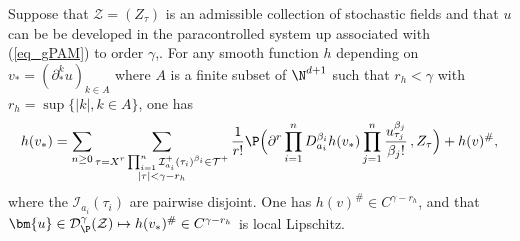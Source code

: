 \documentclass[11pt]{preprint}
\newcommand{\mcI}{\mathcal{I}}
\newcommand{\mcD}{\mathcal{D}}
\newcommand{\mcZ}{\mathcal{Z}}
\newcommand{\mcT}{\mathcal{T}}
\newcounter{theorem}
\def\eqref#1{(\ref{#1})}
\begin{document}
	
 	\begin{theorem}\label{prop_paralinearization}
		Suppose that $\mcZ=(Z_\tau)$ is an admissible collection of stochastic fields and that $u$ can be be developed in the paracontrolled system up associated with \eqref{eq_gPAM} to order $\gamma$,.
For any smooth function $h$ depending on $v_* = (\partial^k_{*} u)_{k \in A}$ where $A$ is a finite subset of $\N^{d+1}$ such that $r_h<\gamma$ with $r_h =\sup \{ |k|,k\in A\} $, one has 
			$$
			h(v_*) = \sum_{n\geq 0}\sum_{\substack{\tau=  X^r \prod_{i=1}^{n}\mcI^+_{a_i}(\tau_i)^{\beta_i}\in\mcT^+ \\ |\tau|<\gamma-r_h}} \frac{1}{ r!}\P\Big( \partial^r \prod_{i=1}^n D_{a_i}^{\beta_i} h(v_*) \prod_{j=1}^{n} \frac{u_{\tau_j}^{\beta_j}}{\beta_j!} \, ,Z_\tau\Big)  + h(v)^\#,
			$$
			where the $ \mathcal{I}_{a_i}(\tau_i) $ are pairwise disjoint. One has $h(v)^\#\in C^{\gamma-r_h}$, and that $\bm{u}\in\mcD^\gamma_\P(\mcZ) \mapsto h(v_*)^\#\in C^{\gamma-r_h}$ is local Lipschitz.
	\end{theorem}
	
\end{document}
